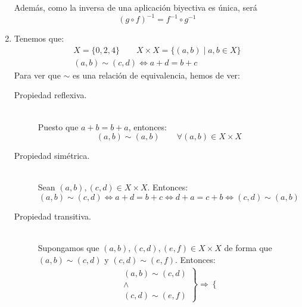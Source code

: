 \documentclass[12pt]{article}
\begin{document}
\begin{ejercicio}[3 puntos]
\begin{enumerate}[label=(\alph*)]
                Además, como la inversa de una aplicación biyectiva es única, será
                \begin{equation*}
                    {(g\circ f)}^{-1} = f^{-1} \circ g^{-1}
                \end{equation*}
            \item Tenemos que:
                \begin{gather*}
                    X=\{0,2,4\} \qquad X\times X=\{(a,b) \mid a,b\in X\} \\
                    (a,b)\sim (c,d) \Longleftrightarrow a+d = b+c
                \end{gather*}
                Para ver que $\sim$ es una relación de equivalencia, hemos de ver:
                \begin{description}
                    \item [Propiedad reflexiva.]~\\
                        Puesto que $a+b=b+a$, entonces:
                        \begin{equation*}
                            (a,b)\sim (a,b) \qquad \forall (a,b)\in X\times X
                        \end{equation*}
                    \item [Propiedad simétrica.]~\\
                        Sean $(a,b),(c,d)\in X\times X$. Entonces:
                        \begin{equation*}
                            (a,b)\sim (c,d) \Longleftrightarrow a+d=b+c \Longleftrightarrow d+a = c+b \Longleftrightarrow (c,d)\sim (a,b)
                        \end{equation*}
                    \item [Propiedad transitiva.]~\\
                        Supongamos que $(a,b),(c,d),(e,f)\in X\times X$ de forma que $(a,b)\sim(c,d)$ y $(c,d)\sim (e,f)$. Entonces:
                        \begin{align*}
                            &\left.\begin{array}{c}
                                    (a,b) \sim (c,d) \\
                                    \land \\
                                    (c,d) \sim (e,f)
                            \end{array}\right\} \Longrightarrow 
                            \left\{\begin{array}{c}

\end{array}
\end{align*}
\end{description}
\end{enumerate}
\end{ejercicio}
\end{document}
